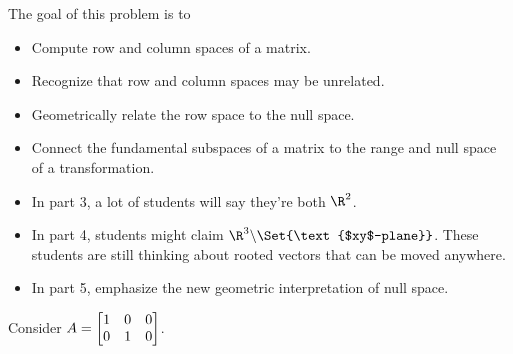 	\displayonlynewpage
	\bookonlynewpage

	\question
	\begin{annotation}
		\begin{goals}

			The goal of this problem is to
			\begin{itemize}
				\item Compute row and column spaces of a matrix.
				\item Recognize that row and column spaces may be unrelated.
				\item Geometrically relate the row space to the null space.
				\item Connect the fundamental subspaces of a matrix to the
					range and null space of a transformation.
			\end{itemize}
		\end{goals}

		\begin{notes}
			\begin{itemize}
				\item In part 3, a lot of students will say they're both $\R^2$.
				\item In part 4, students might claim $\R^3\backslash\Set{\text{$xy$-plane}}$.
					These students are still thinking about rooted vectors that can be moved anywhere.
				\item In part 5, emphasize the new geometric interpretation of null space.
			\end{itemize}
		\end{notes}
	\end{annotation}
	\label{fundamentalSubspaces}
	Consider $A=\mat{1&0&0\\0&1&0}$.
